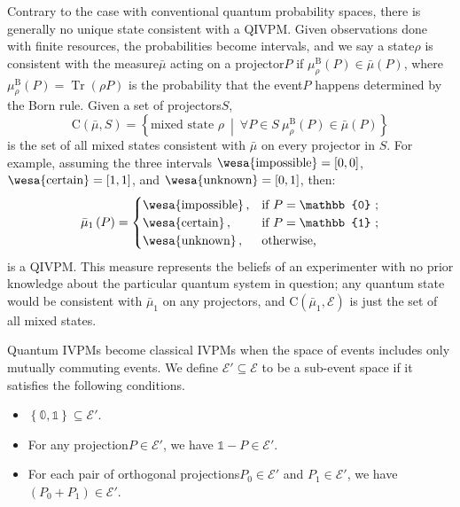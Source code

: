 \documentclass[english,reprint, aps, prl,superscriptaddress, showpacs,
showkeys, longbibliography, amsmath, amssymb]{revtex4-1}
\theoremstyle{plain}
\theoremstyle{definition}
\newcommand{\events}{\ensuremath{\mathcal{E}}}
\newcommand{\imposs}{{\text{\wesa{impossible}}}}
\newcommand{\necess}{{\text{\wesa{certain}}}}
\newcommand{\unknown}{{\text{\wesa{unknown}}}}
\newcommand{\set}[2]{\ensuremath{\left\{ {#1}~\middle|~{#2}\right\} }}
\newcommand{\Tr}{\ensuremath{\mathop{\mathrm{Tr}}\nolimits}}
\newcommand{\coreBorn}{\ensuremath{\mathrm{C}}}
\newcommand{\nb}{\nolinebreak[1] }
\begin{document}
Contrary to the case with conventional quantum probability spaces,
there is generally no unique state consistent with a QIVPM. Given
observations done with finite resources, the probabilities become
intervals, and we say a state\nb$\rho$ is consistent with the
measure\nb$\bar{\mu}$ acting on a projector\nb$P$ if
$\mu_{\rho}^{\mathrm{B}}\left(P\right)\in\bar{\mu}\left(P\right)$,
where $\mu_{\rho}^{\mathrm{B}}\left(P\right)=\Tr\left(\rho P\right)$
is the probability that the event\nb$P$ happens determined by the
Born rule\nb\citep{Born1983,peres1995quantum,544199}. Given a set
of projectors\nb$S$, 
\begin{equation}
\coreBorn\left(\bar{\mu},S\right)=\set{\textrm{mixed state }\rho}{\forall P\in S\ \mu_{\rho}^{\mathrm{B}}\left(P\right)\in\bar{\mu}\left(P\right)}
\end{equation}
is the set of all mixed states consistent with $\bar{\mu}$ on every
projector in $S$. For example, assuming the three intervals $\imposs=\left[0,0\right]$,
$\necess=\left[1,1\right]$, and $\unknown=\left[0,1\right]$, then:
\begin{equation}
\bar{\mu}_{1}\left(P\right)=\begin{cases}
\imposs\,, & \text{if }P=\mathbb{0}\text{ ;}\\
\necess\,, & \text{if }P=\mathbb{1}\text{ ;}\\
\unknown\,, & \text{otherwise,}
\end{cases}\label{eq:no-information-IVPM}
\end{equation}
is a QIVPM. This measure represents the beliefs of an experimenter
with no prior knowledge about the particular quantum system in question;
any quantum state would be consistent with $\bar{\mu}_{1}$ on any
projectors, and $\coreBorn\left(\bar{\mu}_{1},\events\right)$ is
just the set of all mixed states.

Quantum IVPMs become classical IVPMs when the space of events includes
only mutually commuting events. We define $\events'\subseteq\events$
to be a sub-event space if it satisfies the following conditions.
\begin{itemize}
\item $\left\{ \mathbb{0},\mathbb{1}\right\} \subseteq\events'$.
\item For any projection\nb$P\in\events'$, we have $\mathbb{1}-P\in\events'$. 
\item For each pair of orthogonal projections\nb$P_0 \in \events'$ and
  $P_1 \in \events'$, we have $(P_0 + P_1) \in \events'$. 
\end{itemize}
\end{document}
